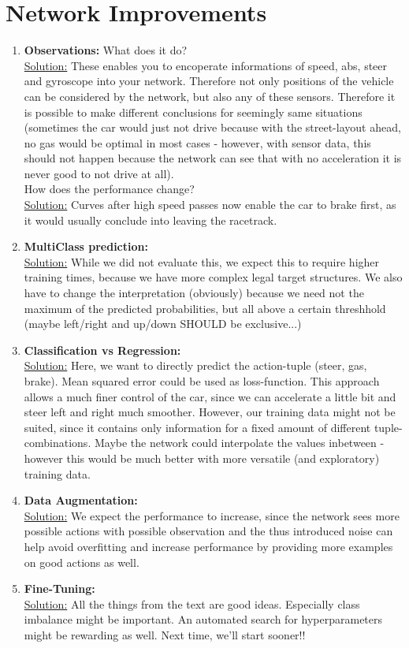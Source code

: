 \documentclass[DIN, pagenumber=false, fontsize=11pt, parskip=half]{scrartcl}
\newcommand{\sol}{\underline{Solution:} }
\begin{document}
\section{Network Improvements}
\begin{enumerate}
	\item \textbf{Observations:} What does it do?\\\sol
          These enables you to encoperate informations of speed, abs, steer and gyroscope into your network.
          Therefore not only positions of the vehicle can be considered by the network, but also any of these sensors.
          Therefore it is possible to make different conclusions for seemingly same situations (sometimes the car would
          just not drive because with the street-layout ahead, no gas would be optimal in most cases - however, with
          sensor data, this should not happen because the network can see that with no acceleration it is never good to
          not drive at all).\\
	
	How does the performance change?
	\\\sol Curves after high speed passes now enable the car to brake first, as it would usually conclude into leaving the racetrack.	
	\item \textbf{MultiClass prediction:}\\\sol
          While we did not evaluate this, we expect this to require higher training times, because we have more complex
          legal target structures. We also have to change the interpretation (obviously) because we need not the maximum
          of the predicted probabilities, but all above a certain threshhold (maybe left/right and up/down SHOULD be
          exclusive...)

	\item \textbf{Classification vs Regression:}\\\sol
          Here, we want to directly predict the action-tuple (steer, gas, brake). Mean squared error could be used as
          loss-function. This approach allows a much finer control of the car, since we can accelerate a little bit and
          steer left and right much smoother. However, our training data might not be suited, since it contains only
          information for a fixed amount of different tuple-combinations. Maybe the network could interpolate the values
          inbetween - however this would be much better with more versatile (and exploratory) training data.

	\item \textbf{Data Augmentation:}\\\sol
          We expect the performance to increase, since the network sees more possible actions with possible observation
          and the thus introduced noise can help avoid overfitting and increase performance by providing more examples
          on good actions as well.

	\item \textbf{Fine-Tuning:}\\\sol
          All the things from the text are good ideas. Especially class imbalance might be important. An automated
          search for hyperparameters might be rewarding as well. Next time, we'll start sooner!!

\end{enumerate}
\end{document}
